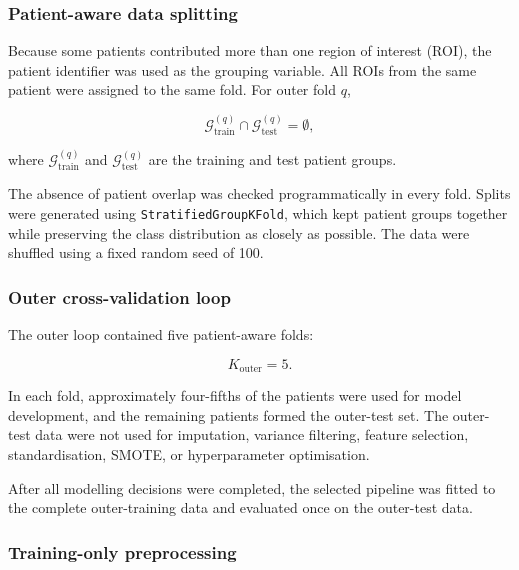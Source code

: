 \documentclass[12pt,twocolumn]{article}
\begin{document}
\subsubsection{Patient-aware data splitting}
\label{subsubsec:patient_aware_splitting}

Because some patients contributed more than one region of interest
(ROI), the patient identifier was used as the grouping variable. All
ROIs from the same patient were assigned to the same fold. For outer
fold \(q\),

\begin{equation}
\mathcal{G}^{(q)}_{\mathrm{train}}
\cap
\mathcal{G}^{(q)}_{\mathrm{test}}
=
\emptyset,
\label{eq:patient_group_separation}
\end{equation}

where \(\mathcal{G}^{(q)}_{\mathrm{train}}\) and
\(\mathcal{G}^{(q)}_{\mathrm{test}}\) are the training and test patient
groups.

The absence of patient overlap was checked programmatically in every
fold. Splits were generated using
\texttt{StratifiedGroupKFold}, which kept patient groups together while
preserving the class distribution as closely as possible. The data were
shuffled using a fixed random seed of 100.

\subsubsection{Outer cross-validation loop}
\label{subsubsec:outer_cv}

The outer loop contained five patient-aware folds:

\begin{equation}
K_{\mathrm{outer}}=5.
\label{eq:outer_folds}
\end{equation}

In each fold, approximately four-fifths of the patients were used for
model development, and the remaining patients formed the outer-test
set. The outer-test data were not used for imputation, variance
filtering, feature selection, standardisation, SMOTE, or
hyperparameter optimisation.

After all modelling decisions were completed, the selected pipeline
was fitted to the complete outer-training data and evaluated once on
the outer-test data.

\subsubsection{Training-only preprocessing}
\label{subsubsec:training_preprocessing}
\end{document}

